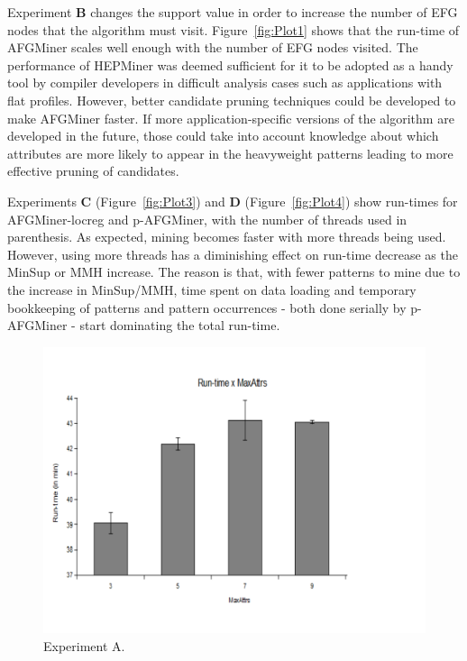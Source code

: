 Experiment {\bf B} changes the support value in order to increase the number of EFG nodes that the algorithm must visit. Figure~\ref{fig:Plot1} shows that the run-time of AFGMiner scales well enough with the number of EFG nodes visited. The performance of HEPMiner was deemed sufficient for it to be adopted as a handy tool by compiler developers in difficult analysis cases such as applications with flat profiles. However, better candidate pruning techniques could be developed to make AFGMiner faster. If more application-specific versions of the algorithm are developed in the future, those could take into account knowledge about which attributes are more likely to appear in the heavyweight patterns leading to more effective pruning of candidates.

Experiments {\bf C} (Figure~\ref{fig:Plot3}) and {\bf D} (Figure~\ref{fig:Plot4}) show run-times for AFGMiner-locreg and p-AFGMiner, with the number of threads used in parenthesis. As expected, mining becomes faster with more threads being used. However, using more threads has a diminishing effect on run-time decrease as the MinSup or MMH increase. The reason is that, with fewer patterns to mine due to the increase in MinSup/MMH, time spent on data loading and temporary bookkeeping of patterns and pattern occurrences - both done serially by p-AFGMiner - start dominating the total run-time. 

\begin{figure}[h!]
\centering
    \includegraphics[scale=0.4]{figures/plot2.pdf}
    \caption{Experiment A.}
    \label{fig:Plot2}  
\end{figure}

